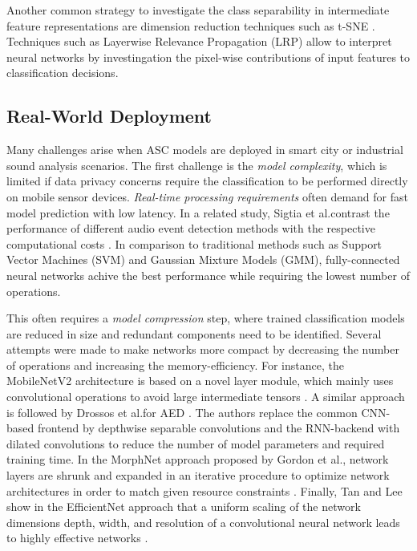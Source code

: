 \documentclass[applsci,article,submit,oneauthor,pdftex]{Definitions/mdpi}
\makeatletter
\newcommand{\etal}{{et al}.\@ }
\makeatother
\begin{document}
Another common strategy to investigate the class separability in intermediate feature representations are dimension reduction techniques such as t-SNE \citep{Singh:2019:MultiViewFeatures:DCASE}. 
Techniques such as Layerwise Relevance Propagation (LRP) \citep{Bach:2015:LRP:PLOS} allow to interpret neural networks by investingation the pixel-wise contributions of input features to classification decisions.

\subsection{Real-World Deployment}
Many challenges arise when ASC models are deployed in smart city \citep{Bello:2018:SONYC:CACM, Abesser:2019:Stadtlaerm:DCASE} or industrial sound analysis \citep{Grollmisch:2019:ISA:EUSIPCO} scenarios.
The first challenge is the \textit{model complexity}, which is limited if data privacy concerns require the classification to be performed directly on mobile sensor devices.
\textit{Real-time processing requirements} often demand for fast model prediction with low latency.
In a related study, Sigtia \etal contrast the performance of different audio event detection methods with the respective computational costs \citep{Sigtia:2016:PerformanceCost:IEEE_TASLP}. In comparison to traditional methods such as Support Vector Machines (SVM) and Gaussian Mixture Models (GMM), fully-connected neural networks achive the best performance while requiring the lowest number of operations.

This often requires a \textit{model compression} step, where trained classification models are reduced in size and redundant components need to be identified. 
Several attempts were made to make networks more compact by decreasing the number of operations and increasing the memory-efficiency.
For instance, the MobileNetV2 architecture is based on a novel layer module, which mainly uses convolutional operations to avoid large intermediate tensors
\citep{Sandler:2018:MobileNet:CVPR}.
A similar approach is followed by Drossos \etal for AED \citep{Drossos:2020:SED:ARXIV}. The authors replace the common CNN-based frontend by depthwise separable convolutions and the RNN-backend with dilated convolutions to reduce the number of model parameters and required training time.
In the MorphNet approach proposed by Gordon \etal, network layers are shrunk and expanded in an iterative procedure to optimize network architectures in order to match given resource constraints \citep{Gordon:2018:MorphNet:CVPR}. 
Finally, Tan and Lee show in the EfficientNet approach that a uniform scaling of the network dimensions depth, width, and resolution of a convolutional neural network leads to highly effective networks \citep{Tan:2019:EfficientNet:ICML}.
\end{document}
